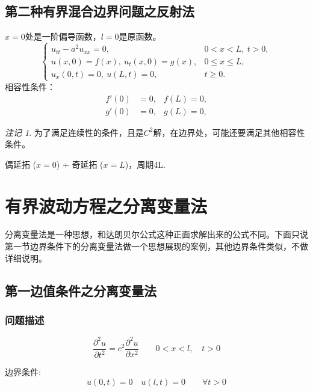 \documentclass[12pt,a4paper]{article}
\numberwithin{subsection}{section}
\numberwithin{subsubsection}{subsection}
\theoremstyle{plain}
\theoremstyle{definition}
\theoremstyle{remark}
\newtheorem{remark}[theorem]{注记}
\begin{document}
\subsection{第二种有界混合边界问题之反射法}
	$x=0$处是一阶偏导函数，$ l=0$是原函数。
		\begin{equation}
		\begin{cases}
			u_{tt} - a^2 u_{xx} = 0, & 0 < x < L, \ t > 0, \\
			u(x, 0) = f(x), \ u_t(x, 0) = g(x), & 0 \leq x \leq L, \\
			u_x(0, t) = 0, \ u(L, t) = 0, & t \geq 0.
		\end{cases}
	\end{equation}
	相容性条件：
	\begin{equation}
		\begin{aligned}
			f'(0) & = 0, & f(L)  = 0, \\
			g'(0) & =0, & g(L)  = 0,
		\end{aligned}
	\end{equation}
	\begin{remark}
		为了满足连续性的条件，且是$C^2$解，在边界处，可能还要满足其他相容性条件。
	\end{remark}
	
	偶延拓 ($x=0$) + 奇延拓 ($x=L$)，周期4L.
	


	
	
	\section{有界波动方程之分离变量法}
	分离变量法是一种思想，和达朗贝尔公式这种正面求解出来的公式不同。下面只说第一节边界条件下的分离变量法做一个思想展现的案例，其他边界条件类似，不做详细说明。
	\subsection{第一边值条件之分离变量法}
	\subsubsection{问题描述}
	\begin{equation} \label{eq:wave_equation}
		\frac{\partial^2 u}{\partial t^2} = c^2 \frac{\partial^2 u}{\partial x^2} \qquad 0 < x < l, \quad t > 0
	\end{equation}
	
	边界条件:
	\begin{equation} \label{eq:boundary_conditions}
		u(0, t) = 0 \quad u(l, t) = 0 \qquad \forall t > 0
	\end{equation}
	
\end{document}
